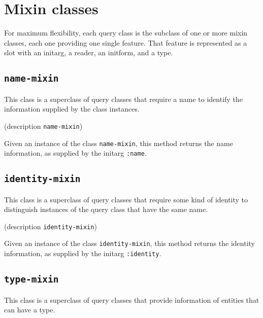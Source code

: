 \section{Mixin classes}

For maximum flexibility, each query class is the subclass of one or
more mixin classes, each one providing one single feature.  That
feature is represented as a slot with an initarg, a reader, an
initform, and a type.

\subsection{\texttt{name-mixin}}
\label{sec-name-mixin}


This class is a superclass of query classes that require a name to
identify the information supplied by the class instances.


 {(description {\tt name-mixin})}

Given an instance of the class \texttt{name-mixin}, this method
returns the name information, as supplied by the initarg
\texttt{:name}.

\subsection{\texttt{identity-mixin}}
\label{sec-identity-mixin}


This class is a superclass of query classes that require some kind of
identity to distinguish instances of the query class that have the
same name.


 {(description {\tt identity-mixin})}

Given an instance of the class \texttt{identity-mixin}, this method
returns the identity information, as supplied by the initarg
\texttt{:identity}.

\subsection{\texttt{type-mixin}}
\label{sec-type-mixin}


This class is a superclass of query classes that provide information
of entities that can have a type.

